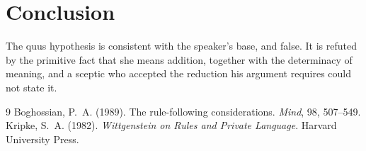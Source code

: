 \documentclass{situationist-preprint}
\begin{document}
\section{Conclusion}

The quus hypothesis is consistent with the speaker's base, and false. It is refuted by the primitive fact that she means addition, together with the determinacy of meaning, and a sceptic who accepted the reduction his argument requires could not state it.

\begin{thebibliography}{9}\small
{} Boghossian, P.~A. (1989). The rule-following considerations. \emph{Mind}, 98, 507--549.
 Kripke, S.~A. (1982). \emph{Wittgenstein on Rules and Private Language}. Harvard University Press.
\end{thebibliography}
\end{document}
